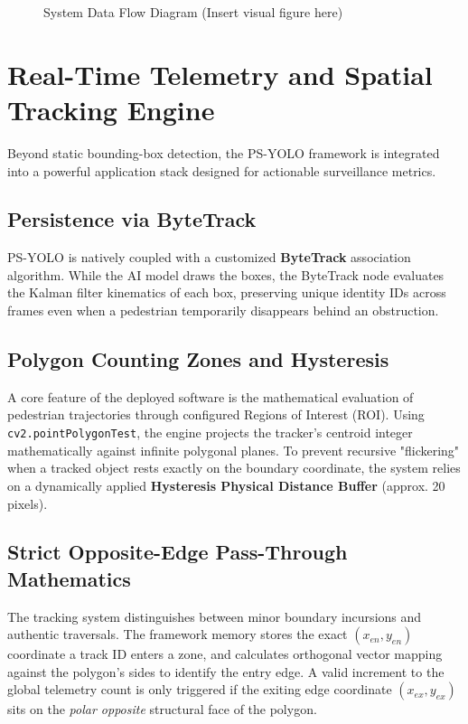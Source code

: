 \documentclass[11pt,a4paper]{article}
\begin{document}
\begin{figure}[htbp]
    \centering
    \caption{System Data Flow Diagram (Insert visual figure here)}
    \label{fig:dataflow}
\end{figure}

\section{Real-Time Telemetry and Spatial Tracking Engine}
Beyond static bounding-box detection, the PS-YOLO framework is integrated into a powerful application stack designed for actionable surveillance metrics.

\subsection{Persistence via ByteTrack}
PS-YOLO is natively coupled with a customized \textbf{ByteTrack} association algorithm. While the AI model draws the boxes, the ByteTrack node evaluates the Kalman filter kinematics of each box, preserving unique identity IDs across frames even when a pedestrian temporarily disappears behind an obstruction.

\subsection{Polygon Counting Zones and Hysteresis}
A core feature of the deployed software is the mathematical evaluation of pedestrian trajectories through configured Regions of Interest (ROI). Using \texttt{cv2.pointPolygonTest}, the engine projects the tracker's centroid integer mathematically against infinite polygonal planes. To prevent recursive "flickering" when a tracked object rests exactly on the boundary coordinate, the system relies on a dynamically applied \textbf{Hysteresis Physical Distance Buffer} (approx. 20 pixels).

\subsection{Strict Opposite-Edge Pass-Through Mathematics}
The tracking system distinguishes between minor boundary incursions and authentic traversals. The framework memory stores the exact $(x_{en}, y_{en})$ coordinate a track ID enters a zone, and calculates orthogonal vector mapping against the polygon's sides to identify the entry edge. A valid increment to the global telemetry count is only triggered if the exiting edge coordinate $(x_{ex}, y_{ex})$ sits on the \textit{polar opposite} structural face of the polygon.
\end{document}
